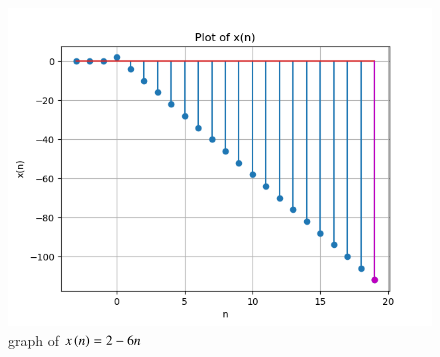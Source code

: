 \documentclass[journal,12pt,twocolumn]{IEEEtran}
\theoremstyle{remark}
\begin{document}
    \begin{figure}[ht]
    \renewcommand\thefigure{1}
        \centering
        \includegraphics[width=1\linewidth]{figs/Figure_1.png}
        \caption{graph of $x\left(n\right) = 2 - 6n$}
    \end{figure}
\end{document}
